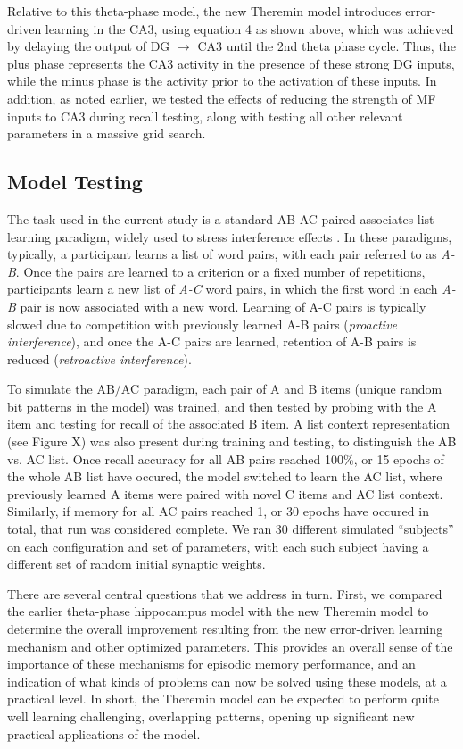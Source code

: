 \documentclass[11pt,twoside]{article}
\newif\myifpdf
\begin{document}
Relative to this theta-phase model, the new Theremin model introduces error-driven learning in the CA3, using equation 4 as shown above, which was achieved by delaying the output of DG $\rightarrow$ CA3 until the 2nd theta phase cycle.  Thus, the plus phase represents the CA3 activity in the presence of these strong DG inputs, while the minus phase is the activity prior to the activation of these inputs.  In addition, as noted earlier, we tested the effects of reducing the strength of MF inputs to CA3 during recall testing, along with testing all other relevant parameters in a massive grid search.

\subsection{Model Testing}

The task used in the current study is a standard AB-AC paired-associates list-learning paradigm, widely used to stress interference effects \citep{BarnesUnderwood60,McCloskeyCohen89}. In these paradigms, typically, a participant learns a list of word pairs, with each pair referred to as \emph{A-B}. Once the pairs are learned to a criterion or a fixed number of repetitions, participants learn a new list of \emph{A-C} word pairs, in which the first word in each \emph{A-B} pair is now associated with a new word. Learning of A-C pairs is typically slowed due to competition with previously learned A-B pairs (\emph{proactive interference}), and once the A-C pairs are learned, retention of A-B pairs is reduced (\emph{retroactive interference}).

To simulate the AB/AC paradigm, each pair of A and B items (unique random bit patterns in the model) was trained, and then tested by probing with the A item and testing for recall of the associated B item.  A list context representation (see Figure X) was also present during training and testing, to distinguish the AB vs. AC list.  Once recall accuracy for all AB pairs reached 100\%, or 15 epochs of the whole AB list have occured, the model switched to learn the AC list, where previously learned A items were paired with novel C items and AC list context. Similarly, if memory for all AC pairs reached 1, or 30 epochs have occured in total, that run was considered complete.  We ran 30 different simulated ``subjects'' on each configuration and set of parameters, with each such subject having a different set of random initial synaptic weights. 

There are several central questions that we address in turn.  First, we compared the earlier theta-phase hippocampus model with the new Theremin model to determine the overall improvement resulting from the new error-driven learning mechanism and other optimized parameters.  This provides an overall sense of the importance of these mechanisms for episodic memory performance, and an indication of what kinds of problems can now be solved using these models, at a practical level.  In short, the Theremin model can be expected to perform quite well learning challenging, overlapping patterns, opening up significant new practical applications of the model.
\end{document}
